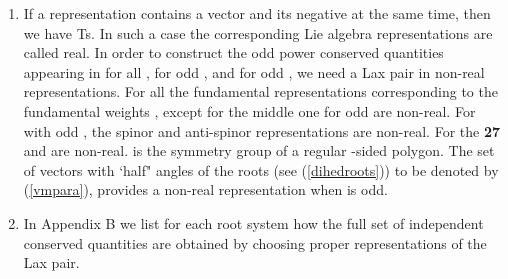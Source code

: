 \documentclass[a4paper,12pt]{article}
\begin{document}
\begin{enumerate}
parametrisation of the \coordHE{} root system:
\begin{equation}\coord{}\boxEquation{
   D_r\ \mbox{root system :}\quad \Delta
   =\{\pm e_j\pm e_k,\quad j,k=1,\ldots,r|
   e_j\in{\bf R}^r, e_j\cdot e_k=\delta_{jk}\}.
   \label{drroots}
}{
   D_r\ \mbox{root system :}\quad \Delta
   =\{\pm e_j\pm e_k,\quad j,k=1,\ldots,r|
   e_j\in{\bf R}^r, e_j\cdot e_k=\delta_{jk}\}.
   }{ecuacion}\coordE{}\end{equation}
\item
If a representation \coordHE{} contains  a vector \myHighlight{\(\mu\)}\coordHE{} and
its negative \myHighlight{\(-\mu\)}\coordHE{} at the same time, then we have Ts\coordHE{}.
In such a case the corresponding Lie algebra
representations are called real.
In order to construct the odd power conserved quantities appearing in
\coordHE{} for all \coordHE{}, \coordHE{} for odd
\coordHE{},
\coordHE{} and \coordHE{} for odd \coordHE{}, we need  a Lax pair in non-real
representations.
For \coordHE{} all the fundamental representations corresponding to the
fundamental weights \coordHE{}, \coordHE{}
except for the middle one
\coordHE{} for odd \coordHE{} are non-real.
 For  \coordHE{} with odd
\coordHE{},  the spinor and anti-spinor
representations are non-real. For \coordHE{} the {\bf 27} and \coordHE{} are non-real.
\coordHE{} is the symmetry group of a regular \coordHE{}-sided polygon.
The set of \coordHE{} vectors with `half" angles
of the roots (see (\ref{dihedroots}))
to be denoted by \coordHE{} (\ref{vmpara}), provides a non-real representation
when \coordHE{} is odd.
\item
In Appendix B we list for each root system how the full set of independent
conserved quantities are obtained by choosing proper representations of the
Lax pair.

\end{enumerate}
\end{document}
